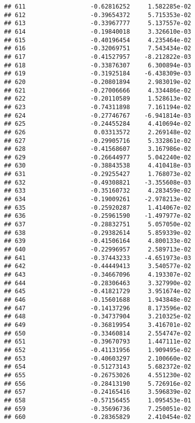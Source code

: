 \documentclass[
]{article}
\begin{document}
\begin{verbatim}
## 611                  -0.62816252     1.582285e-02
## 612                  -0.39654372     5.715353e-02
## 613                  -0.33967777     5.137557e-02
## 614                  -0.19840018     3.326610e-03
## 615                  -0.40196454     4.235464e-02
## 616                  -0.32069751     7.543434e-02
## 617                  -0.41527957    -8.212822e-03
## 618                  -0.33876307     6.300894e-03
## 619                  -0.31925184    -6.438309e-03
## 620                  -0.20801894     2.983019e-02
## 621                  -0.27006666     4.334486e-02
## 622                  -0.20110589     1.528613e-02
## 623                  -0.74311898     7.161194e-02
## 624                  -0.27746767    -6.941814e-03
## 625                  -0.24455284     4.410694e-02
## 626                   0.03313572     2.269148e-02
## 627                  -0.29905716     5.332861e-02
## 628                  -0.41568607     3.167986e-02
## 629                  -0.26644977     5.042240e-02
## 630                  -0.38843538     4.410418e-03
## 631                  -0.29255427     1.768073e-02
## 632                  -0.49308821    -3.355608e-03
## 633                  -0.35160732     4.283459e-02
## 634                  -0.19009261    -2.978213e-02
## 635                  -0.25920287     1.414067e-02
## 636                  -0.25961590    -1.497977e-02
## 637                  -0.28832751     5.057050e-02
## 638                  -0.29382614     5.859339e-02
## 639                  -0.41506164     4.800133e-02
## 640                  -0.22996957     2.589713e-02
## 641                  -0.37443233    -4.651973e-03
## 642                  -0.44449413     3.540577e-02
## 643                  -0.34667096     4.193307e-02
## 644                  -0.28306463     3.327990e-02
## 645                  -0.41821729     3.951674e-02
## 646                  -0.15601688     1.943848e-02
## 647                  -0.14137296     8.173596e-02
## 648                  -0.34737904     3.210325e-02
## 649                  -0.36819954     3.416701e-02
## 650                  -0.33460814     2.554747e-02
## 651                  -0.39670793     1.447111e-02
## 652                  -0.41131956     1.909495e-02
## 653                  -0.40603297     2.100660e-02
## 654                  -0.51273143     5.682372e-02
## 655                  -0.26753026     4.551230e-02
## 656                  -0.28413190     5.726916e-02
## 657                  -0.24165416     3.596839e-02
## 658                  -0.57156455     1.095453e-01
## 659                  -0.35696736     7.250051e-02
## 660                  -0.28365829     2.410454e-02

\end{verbatim}
\end{document}

